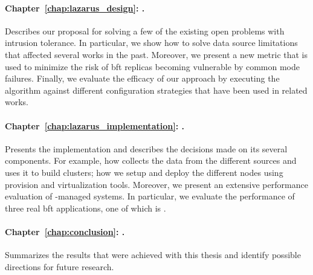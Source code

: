 \paragraph{Chapter~\ref{chap:lazarus_design}: .}
Describes our proposal for solving a few of the existing open problems with intrusion tolerance.
In particular, we show how to solve data source limitations that affected several works in the past.
Moreover, we present a new metric that is used to minimize the risk of \gls{bft} replicas becoming vulnerable by common mode failures.
Finally, we evaluate the efficacy of our approach by executing the algorithm against different configuration strategies that have been used in related works.


\paragraph{Chapter~\ref{chap:lazarus_implementation}: .}
Presents the \system implementation and describes the decisions made on its several components.
For example, how \system collects the data from the different sources and uses it to build clusters; how we setup and deploy the different nodes using provision and virtualization tools.  
Moreover, we present an extensive performance evaluation of \system-managed systems.
In particular, we evaluate the performance of three real \gls{bft} applications, one of which is \sieveq.



\paragraph{Chapter~\ref{chap:conclusion}: .}
Summarizes the results that were achieved with this thesis and identify possible directions for future research.   

